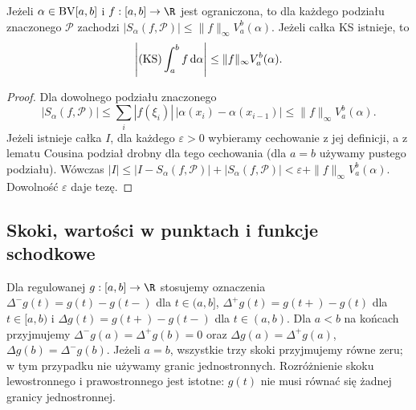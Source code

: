 \begin{lemat}
\label{lem:ks-var}
Jeżeli $\alpha\in\mathrm{BV}[a,b]$ i $f:[a,b]\to\R$ jest ograniczona, to dla każdego podziału znaczonego $\mathcal P$ zachodzi $|S_\alpha(f,\mathcal P)|\le\|f\|_\infty V_a^b(\alpha)$. Jeżeli całka KS istnieje, to
\[
 \left|(\mathrm{KS})\int_a^b f\,\mathrm d\alpha\right|\le\|f\|_\infty V_a^b(\alpha).
\]
\end{lemat}
\begin{proof}
Dla dowolnego podziału znaczonego
\[
 |S_\alpha(f,\mathcal P)|
 \le\sum_i|f(\xi_i)|\,|\alpha(x_i)-\alpha(x_{i-1})|
 \le\|f\|_\infty V_a^b(\alpha).
\]
Jeżeli istnieje całka $I$, dla każdego $\varepsilon>0$
wybieramy cechowanie z jej definicji, a z lematu Cousina
podział drobny dla tego cechowania (dla $a=b$ używamy
pustego podziału). Wówczas
$|I|\le |I-S_\alpha(f,\mathcal P)|+|S_\alpha(f,\mathcal P)|
<\varepsilon+\|f\|_\infty V_a^b(\alpha)$.
Dowolność $\varepsilon$ daje tezę.
\end{proof}

\subsection*{Skoki, wartości w punktach i funkcje schodkowe}
Dla regulowanej $g:[a,b]\to\R$ stosujemy oznaczenia $\Delta^-g(t)=g(t)-g(t-)$ dla $t\in(a,b]$, $\Delta^+g(t)=g(t+)-g(t)$ dla $t\in[a,b)$ i $\Delta g(t)=g(t+)-g(t-)$ dla $t\in(a,b)$. Dla $a<b$ na końcach przyjmujemy $\Delta^-g(a)=\Delta^+g(b)=0$ oraz $\Delta g(a)=\Delta^+g(a)$, $\Delta g(b)=\Delta^-g(b)$. Jeżeli $a=b$, wszystkie trzy skoki przyjmujemy równe zeru; w tym przypadku nie używamy granic jednostronnych. Rozróżnienie skoku lewostronnego i prawostronnego jest istotne: $g(t)$ nie musi równać się żadnej granicy jednostronnej.

